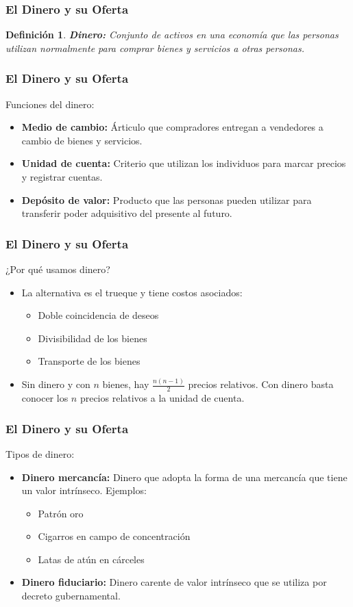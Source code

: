 \documentclass[dvipsnames,table,leqno]{beamer}
\newtheorem{mydef}{Definición}
\newcommand{\rp}[1]{\left(#1\right)}
\begin{document}
		\begin{frame}
			\frametitle{El Dinero y su Oferta}
			\begin{mydef}
				\textbf{Dinero:} Conjunto de activos en una economía que las personas utilizan normalmente para comprar bienes y servicios a otras personas.
			\end{mydef}
		\end{frame}	

		\begin{frame}
			\frametitle{El Dinero y su Oferta}
			Funciones del dinero:
			\begin{itemize}
				\item \textbf{Medio de cambio:} Árticulo que compradores entregan a vendedores a cambio de bienes y servicios.
				\item \textbf{Unidad de cuenta:} Criterio que utilizan los individuos para marcar precios y registrar cuentas.
				\item \textbf{Depósito de valor:} Producto que las personas pueden utilizar para transferir poder adquisitivo del presente al futuro.
			\end{itemize}
		\end{frame}	

		\begin{frame}
			\frametitle{El Dinero y su Oferta}
			¿Por qué usamos dinero?
			\begin{itemize}
				\item La alternativa es el trueque y tiene costos asociados:
					\begin{itemize}
						\item Doble coincidencia de deseos
						\item Divisibilidad de los bienes
						\item Transporte de los bienes
					\end{itemize}
				\item Sin dinero y con $n$ bienes, hay $\frac{n\rp{n-1}}{2}$ precios relativos. Con dinero basta conocer los $n$ precios relativos a la unidad de cuenta.
			\end{itemize}
		\end{frame}	

		\begin{frame}
			\frametitle{El Dinero y su Oferta}
			Tipos de dinero:
			\begin{itemize}
				\item \textbf{Dinero mercancía:} Dinero que adopta la forma de una mercancía que tiene un valor intrínseco. Ejemplos:
					\begin{itemize}
						\item Patrón oro
						\item Cigarros en campo de concentración
						\item Latas de atún en cárceles
					\end{itemize}
				\item \textbf{Dinero fiduciario:} Dinero carente de valor intrínseco que se utiliza por decreto gubernamental.
			\end{itemize}
		\end{frame}		
\end{document}

